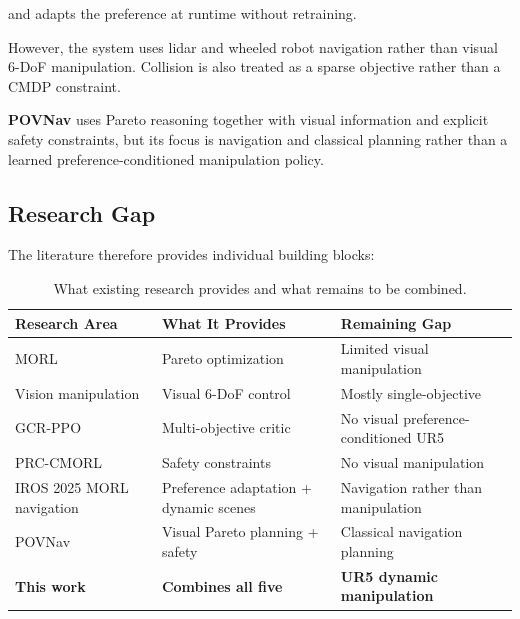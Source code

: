 \documentclass[journal]{IEEEtran}
\begin{document}
and adapts the preference at runtime without retraining.

However, the system uses lidar and wheeled robot navigation rather than
visual 6-DoF manipulation. Collision is also treated as a sparse
objective rather than a CMDP constraint.

\textbf{POVNav} \cite{pushp2025} uses Pareto reasoning together with
visual information and explicit safety constraints, but its focus is
navigation and classical planning rather than a learned
preference-conditioned manipulation policy.


\subsection{Research Gap}

The literature therefore provides individual building blocks:

\begin{table}[t]
\centering
\caption{What existing research provides and what remains to be
combined.}
\label{tab:gap}

\renewcommand{\arraystretch}{1.2}

\begin{tabular}{l l l}
\toprule
\textbf{Research Area}
& \textbf{What It Provides}
& \textbf{Remaining Gap} \\
\midrule

MORL
& Pareto optimization
& Limited visual manipulation \\

Vision manipulation
& Visual 6-DoF control
& Mostly single-objective \\

GCR-PPO
& Multi-objective critic
& No visual preference-conditioned UR5 \\

PRC-CMORL
& Safety constraints
& No visual manipulation \\

IROS 2025 MORL navigation
& Preference adaptation + dynamic scenes
& Navigation rather than manipulation \\

POVNav
& Visual Pareto planning + safety
& Classical navigation planning \\

\textbf{This work}
& \textbf{Combines all five}
& \textbf{UR5 dynamic manipulation} \\

\bottomrule
\end{tabular}
\end{table}
\end{document}
